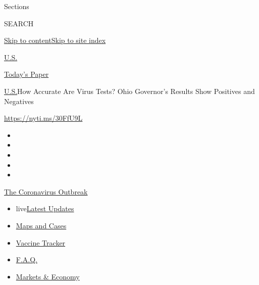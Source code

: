 Sections

SEARCH

\protect\hyperlink{site-content}{Skip to
content}\protect\hyperlink{site-index}{Skip to site index}

\href{https://www.nytimes.com/section/us}{U.S.}

\href{https://myaccount.nytimes.com/auth/login?response_type=cookie\&client_id=vi}{}

\href{https://www.nytimes.com/section/todayspaper}{Today's Paper}

\href{/section/us}{U.S.}\textbar{}How Accurate Are Virus Tests? Ohio
Governor's Results Show Positives and Negatives

\href{https://nyti.ms/30FfU9L}{https://nyti.ms/30FfU9L}

\begin{itemize}
\item
\item
\item
\item
\item
\end{itemize}

\href{https://www.nytimes.com/news-event/coronavirus?action=click\&pgtype=Article\&state=default\&region=TOP_BANNER\&context=storylines_menu}{The
Coronavirus Outbreak}

\begin{itemize}
\tightlist
\item
  live\href{https://www.nytimes.com/2020/08/08/world/coronavirus-updates.html?action=click\&pgtype=Article\&state=default\&region=TOP_BANNER\&context=storylines_menu}{Latest
  Updates}
\item
  \href{https://www.nytimes.com/interactive/2020/us/coronavirus-us-cases.html?action=click\&pgtype=Article\&state=default\&region=TOP_BANNER\&context=storylines_menu}{Maps
  and Cases}
\item
  \href{https://www.nytimes.com/interactive/2020/science/coronavirus-vaccine-tracker.html?action=click\&pgtype=Article\&state=default\&region=TOP_BANNER\&context=storylines_menu}{Vaccine
  Tracker}
\item
  \href{https://www.nytimes.com/interactive/2020/world/coronavirus-tips-advice.html?action=click\&pgtype=Article\&state=default\&region=TOP_BANNER\&context=storylines_menu}{F.A.Q.}
\item
  \href{https://www.nytimes.com/live/2020/08/07/business/stock-market-today-coronavirus?action=click\&pgtype=Article\&state=default\&region=TOP_BANNER\&context=storylines_menu}{Markets
  \& Economy}
\end{itemize}

